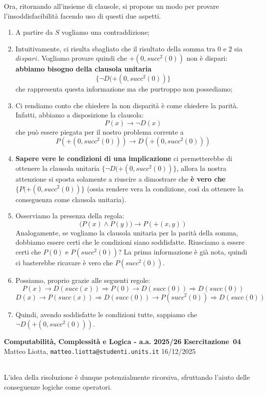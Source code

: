 \documentclass[a4paper,10pt]{article}
\makeatletter
\newcommand{\DocType}{Esercitazione} %
\newcommand{\FullTitle}{\DocType\ \EsercitazioneNum}
\newcommand{\Header}{
\noindent
  \small \textbf{Computabilità, Complessità e Logica - a.a. 2025/26} \hfill \textbf{\FullTitle} \\[0.2cm]
  \scriptsize Matteo Liotta, \texttt{matteo.liotta@studenti.units.it} \hfill \Data \\[0.2cm]
  \noindent\makebox[\linewidth]{\rule{\linewidth}{0.4pt}} \\[0.3cm]}
\newcommand{\NewPageHeader}{
  \vfill
  \noindent\makebox[\linewidth]{\rule{\linewidth}{0.4pt}}
  \newpage
  {\Header}
}
\newcommand{\EsercitazioneNum}{04}
\newcommand{\Data}{16/12/2025}
\makeatother
\begin{document}
Ora, ritornando all'insieme di clausole, si propone un modo per provare l'insoddisfacibilità facendo uso di questi due aspetti. 
\begin{enumerate}
    \item  A partire da $S$ vogliamo una contraddizione;
    \item  Intuitivamente, ci risulta sbagliato che il risultato della somma tra $0$ e $2$ sia $dispari$. Vogliamo provare quindi che $+(0,succ^2(0))$ non è dispari: \textbf{abbiamo bisogno della clausola unitaria}
    $$\{\lnot D(+(0,succ^2(0))\}$$
    che rappresenta questa informazione ma che purtroppo non possediamo;
    \item Ci rendiamo conto che chiedere la non disparità è come chiedere la parità. Infatti, abbiamo a disposizione la clausola:
    $$P(x)\rightarrow \lnot D(x)$$
    che può essere piegata per il nostro problema corrente a 
    $$P(+(0,succ^2(0)))\rightarrow D(+(0,succ^2(0)))$$
    \item \textbf{Sapere vere le condizioni di una implicazione} ci permetterebbe di ottenere la clausola unitaria $\{\lnot D(+(0,succ^2(0))\}$, allora la nostra attenzione si sposta solamente a riuscire a dimostrare che \textbf{è vero che} $\{P(+(0,succ^2(0))\}$ (ossia rendere vera la condizione, così da ottenere la conseguenza come clausola unitaria).
    \item Osserviamo la presenza della regola:
    $$\bigg(P(x)\land P(y)\bigg)\rightarrow P(+(x,y))$$
    Analogamente, se vogliamo la clausola unitaria per la parità della somma, dobbiamo essere certi che le condizioni siano soddisfatte. Riusciamo a essere certi che 
    $P(0)$ e $P(succ^2(0))$? La prima informazione è già nota, quindi ci basterebbe ricavare è vero che $P(succ^2(0))$.
    \item Possiamo, proprio grazie alle seguenti regole:
    $$P(x)\rightarrow D(succ(x)) \Rightarrow P(0)\rightarrow D(succ(0))\Rightarrow D(succ(0))$$
    $$D(x)\rightarrow P(succ(x)) \Rightarrow D(succ(0))\rightarrow P(succ^2(0))\Rightarrow D(succ(0))$$
    \item Quindi, avendo soddisfatte le condizioni tutte, sappiamo che $\lnot D(+(0,succ^2(0)))$.
\end{enumerate}

\NewPageHeader

L'idea della risoluzione è dunque potenzialmente ricorsiva, sfruttando l'aiuto delle conseguenze logiche come operatori.





\vfill
\noindent\makebox[\linewidth]{\rule{\linewidth}{0.1pt}}
\end{document}
